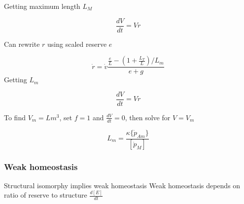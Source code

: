\documentclass[10,portrait]{article}
\begin{document}
Getting maximum length \(L_{M}\)

\[
\frac
{dV}
{dt}
= V\dot{r}  
\]

Can rewrite \(r\) using scaled reserve \(e\)

\[
\dot{r} = 
\dot{v}
\frac
{\frac
{e}
{L} - 
(1 + \frac
{L_{T}} 
{L}
) /
{L_{m}}}
{e + g}
\] Getting \(L_{m}\)

\[
\frac
{dV}
{dt} = 
V\dot{r}
\]

To find \(V_{m} = Lm^{3}\), set \(f = 1\) and \(\frac{dV}{dt} = 0\),
then solve for \(V = V_{m}\)

\[
L_{m}
=
\frac
{\kappa\{\dot{p}_{Am}\}}
{[\dot{p}_{M}]}
\]

\subsubsection{Weak homeostasis}\label{weak-homeostasis}

Structural isomorphy implies weak homeostasis Weak homeostasis depends
on ratio of reserve to structure \(\frac{d[E]}{dt}\)

\printbibliography
\end{document}
